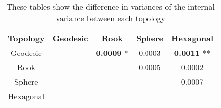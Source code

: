 \begin{table}[hbt]
  \centering
  \caption{These tables show the difference in variances of the internal variance between each topology}
  \label{rlt:allV}
  \begin{tabular}{|c||c|c|c|c|}
  \hline
  \textbf{Topology}&Geodesic &Rook	&Sphere			&Hexagonal		\\\hline
  \hline
  Geodesic	&& \textbf{0.0009} *	& 0.0003		& \textbf{0.0011} **	\\\hline
  Rook		&& 			& 0.0005		& 0.0002		\\\hline
  Sphere	&& 			& 			& 0.0007 		\\\hline
  Hexagonal 	&& 			& 			&			\\\hline
  \end{tabular}
  \end{table}
